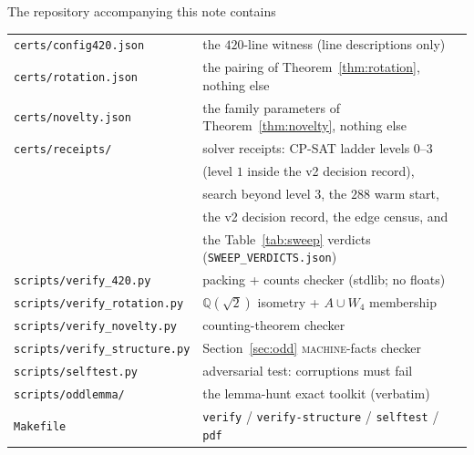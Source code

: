 \documentclass[11pt]{article}
\theoremstyle{remark}
\newcommand{\QQ}{\mathbb{Q}}
\begin{document}
The repository accompanying this note contains
\begin{center}
\begin{tabular}{@{}ll@{}}
\texttt{certs/config420.json} & the $420$-line witness (line descriptions only) \\
\texttt{certs/rotation.json} & the pairing of Theorem~\ref{thm:rotation}, nothing else \\
\texttt{certs/novelty.json} & the family parameters of Theorem~\ref{thm:novelty}, nothing else \\
\texttt{certs/receipts/} & solver receipts: CP-SAT ladder levels $0$--$3$ \\
& (level $1$ inside the v2 decision record), \\
& search beyond level $3$, the $288$ warm start, \\
& the v2 decision record, the edge census, and \\
& the Table~\ref{tab:sweep} verdicts (\texttt{SWEEP\_VERDICTS.json}) \\
\texttt{scripts/verify\_420.py} & packing + counts checker (stdlib; no floats) \\
\texttt{scripts/verify\_rotation.py} & $\QQ(\sqrt2)$ isometry + $A\cup W_4$ membership \\
\texttt{scripts/verify\_novelty.py} & counting-theorem checker \\
\texttt{scripts/verify\_structure.py} & Section~\ref{sec:odd} \textsc{machine}-facts checker \\
\texttt{scripts/selftest.py} & adversarial test: corruptions must fail \\
\texttt{scripts/oddlemma/} & the lemma-hunt exact toolkit (verbatim) \\
\texttt{Makefile} & \texttt{verify} / \texttt{verify-structure} / \texttt{selftest} / \texttt{pdf} \\
\end{tabular}
\end{center}
\end{document}

